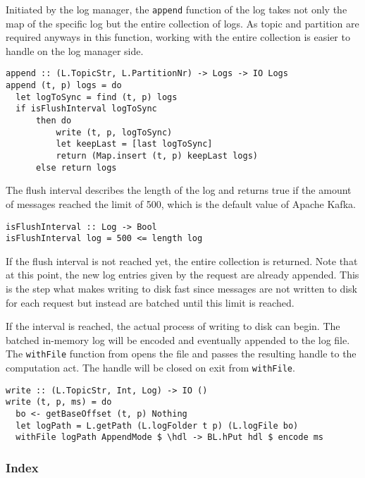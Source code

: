 Initiated by the log manager, the \lstinline{append} function of the log takes
not only the map of the specific log but the entire collection of logs. As topic
and partition are required anyways in this function, working with the entire
collection is easier to handle on the log manager side.

\begin{lstlisting}[caption={Append messages to log}]
append :: (L.TopicStr, L.PartitionNr) -> Logs -> IO Logs
append (t, p) logs = do
  let logToSync = find (t, p) logs
  if isFlushInterval logToSync
      then do
          write (t, p, logToSync)
          let keepLast = [last logToSync]
          return (Map.insert (t, p) keepLast logs)
      else return logs
\end{lstlisting}

The flush interval describes the length of the log and returns true if the
amount of messages reached the limit of 500, which is the default value of
Apache Kafka.

\begin{lstlisting}[caption={Check if enough messages are given for flush to disk}]
isFlushInterval :: Log -> Bool
isFlushInterval log = 500 <= length log
\end{lstlisting}

If the flush interval is not reached yet, the entire collection is returned.
Note that at this point, the new log entries given by the request are already
appended. This is the step what makes writing to disk fast since messages are
not written to disk for each request but instead are batched until this limit is
reached.

If the interval is reached, the actual process of writing to disk can begin.
The batched in-memory log will be encoded and eventually appended to the log
file. The \lstinline{withFile} function from  opens
the file and passes the resulting handle to the computation act. The handle
will be closed on exit from \lstinline{withFile}.

\begin{lstlisting}[caption={Write message to file with AppendMode}]
write :: (L.TopicStr, Int, Log) -> IO ()
write (t, p, ms) = do
  bo <- getBaseOffset (t, p) Nothing
  let logPath = L.getPath (L.logFolder t p) (L.logFile bo)
  withFile logPath AppendMode $ \hdl -> BL.hPut hdl $ encode ms
\end{lstlisting}


\subsubsection{Index}

